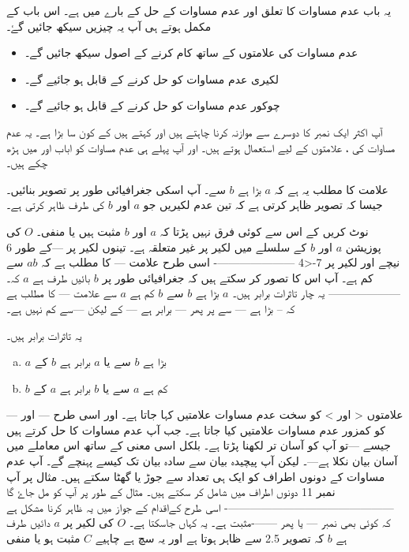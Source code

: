 یہ باب عدم مساوات کا تعلق اور عدم مساوات کے حل کے بارے میں ہے۔ اس باب کے مکمل ہوتے ہی آپ یہ چیزیں سیکھ جائیں گۓ۔ 
\begin{itemize}
\item
عدم مساوات کی علامتوں کے ساتھ کام کرنے کے اصول سیکھ جائیں گے۔
\item
لکیری عدم مساوات کو حل کرنے کے قابل ہو جائیے گے۔
\item
چوکور عدم مساوات کو حل کرنے کے قابل ہو جائیے گے۔
\end{itemize}
آپ اکثر ایک نمبر کا دوسرے سے موازنہ کرنا چاہتے ہیں اور کہتے ہیں کے کون سا بڑا ہے۔ یہ عدم مساوات کی  ،  علامتوں کے لیے استعمال ہوتے ہیں۔ اور آپ پہلے ہی عدم مساوات کو اباب  اور  میں ہڑھ چکے ہیں۔

علامت  کا مطلب یہ ہے کہ \(a\) بڑا ہے \(b\) سے۔ آپ اسکی جغرافیائی طور پر تصویر بنائیں۔جیسا کہ تصویر  ظاہر کرتی ہے کہ تین عدم لکیریں جو \(a\) اور \(b\) کی طرف ظاہر کرتی ہے۔


نوٹ کریں کے اس سے کوئی فرق نہیں پڑتا کہ \(a\) اور \(b\) مثبت ہیں یا منفی۔ \(O\) کی پوزیشن \(a\) اور \(b\) کے سلسلے میں لکیر پر غیر متعلقہ ہے۔ تینوں لکیر پر ---کے طور 6 نیچے اور لکیر پر 7-<4
----------------------
اسی طرح علامت --- کا مطلب ہے کہ \(ab\) سے کم ہے۔ آپ اس کا تصور کر سکتے ہیں کہ جغرافیائی طور پر \(b\) بائیں طرف ہے \(a\) کہ۔
--------------------
یہ چار تاثرات برابر ہیں۔
\(a\)
 بڑا ہے \(b\) سے
\(b\)  
کم ہے \(a\) سے
علامت --- کا مطلب ہے کہ -- بڑا ہے --- سے پر پھر --- برابر ہے --- کے لیکن ---سے کم نہیں ہے۔

یہ تاثرات برابر ہیں۔
\begin{enumerate}[a.]
\item \(a\)
بڑا ہے \(b\) سے یا \(a\) برابر ہے \(b\) کے
\item \(b\)
کم ہے \(a\) سے یا \(b\) برابر ہے \(a\) کے
\end{enumerate}
علامتوں < اور > کو  سخت  عدم مساوات علامتیں کہا جاتا ہے۔ اور اسی طرح --- اور --- کو کمزور عدم مساوات علامتیں کیا جاتا ہے۔
جب آپ عدم مساوات کا حل کرتے ہیں جیسے ---تو آپ کو آسان تر لکھنا پڑتا ہے۔ بلکل اسی معنی کے ساتھ اس معاملے میں آسان بیان نکلا ہے---۔ لیکن آپ پیچیدہ بیان سے سادہ بیان تک کیسے  پہنچے گے۔
آپ عدم مساوات کے دونوں اطراف کو ایک ہی تعداد سے جوڑ یا گھٹا سکتے ہیں۔ مثال پر آپ نمبر 11 دونوں اطراف میں شامل کر سکتے ہیں۔ مثال کے طور پر آپ کو مل جاۓ گا
----------------------------------------------
اسی طرح کےاقدام کے جواز میں یہ ظاہر کرنا مشکل ہے کہ کوئی بھی نمبر --- یا پھر -------مثبت ہے۔ یہ کہاں جاسکتا ہے۔ \(O\) کی لکیر پر \(a\) دائیں طرف ہے \(b\) کہ تصویر 2.5 سے ظاہر ہوتا ہے اور یہ سچ ہے چاہیے \(C\) مثبت ہو یا منفی 

